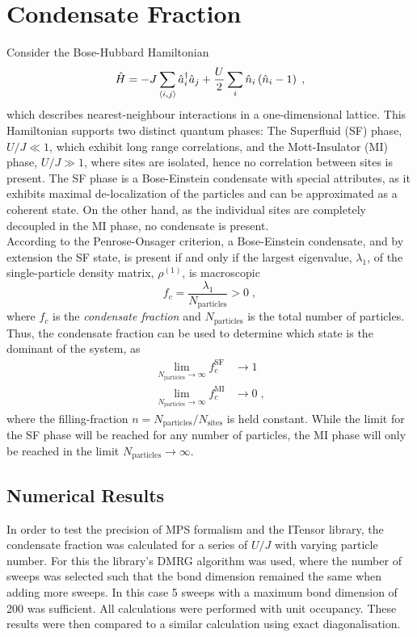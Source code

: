 \chapter{Condensate Fraction}\label{CondFrac}

Consider the Bose-Hubbard Hamiltonian
\begin{equation}
	\hat{H} = -J \sum_{\braket{i,j}} \hat{a}_{i}^{\dag} \hat{a}_j + \frac{U}{2} \sum_{i} \hat{n}_i \left( \hat{n}_i -1 \right) \; , 
\end{equation}
which describes nearest-neighbour interactions in a one-dimensional lattice. This Hamiltonian supports two distinct quantum phases: The Superfluid (SF) phase, $U/J \ll 1$, which exhibit long range correlations, and the Mott-Insulator (MI) phase, $U/J \gg 1$, where sites are isolated, hence no correlation between sites is present. The SF phase is a Bose-Einstein condensate with special attributes, as it exhibits maximal de-localization of the particles and can be approximated as a coherent state. On the other hand, as the individual sites are completely decoupled in the MI phase, no condensate is present. \\
According to the Penrose-Onsager criterion, a Bose-Einstein condensate, and by extension the SF state, is present if and only if the largest eigenvalue, $\lambda_1$, of the single-particle density matrix, $\rho^{(1)}$, is macroscopic
\begin{equation}
	f_c = \frac{\lambda_1}{N_{\mathrm{particles}}} > 0 \; ,
\end{equation} 
where $f_c$ is the \textit{condensate fraction} and $N_{\mathrm{particles}}$ is the total number of particles. Thus, the condensate fraction can be used to determine which state is the dominant of the system, as
\begin{align}
	\lim_{N_{\mathrm{particles}} \to \infty} f_{c}^{\mathrm{SF}} &\to 1 \label{eq:SF_lim} \\
	\lim_{N_{\mathrm{particles}} \to \infty} f_{c}^{\mathrm{MI}} &\to 0 \; , \label{eq:MI_lim}
\end{align}
where the filling-fraction $n = N_{\mathrm{particles}}/N_{\mathrm{sites}}$ is held constant. While the limit for the SF phase will be reached for any number of particles, the MI phase will only be reached in the limit $N_{\mathrm{particles}} \to \infty$.

\section{Numerical Results}
In order to test the precision of MPS formalism and the ITensor library, the condensate fraction was calculated for a series of $U/J$ with varying particle number. For this the library's DMRG algorithm was used, where the number of sweeps was selected such that the bond dimension remained the same when adding more sweeps. In this case 5 sweeps with a maximum bond dimension of 200 was sufficient. All calculations were performed with unit occupancy. These results were then compared to a similar calculation using exact diagonalisation.

